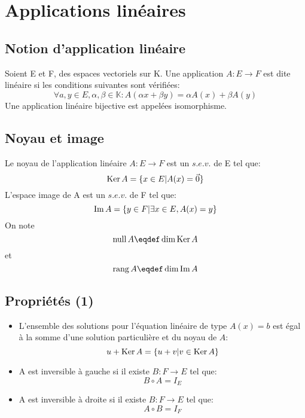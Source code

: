 \section{Applications linéaires}

\subsection{Notion d'application linéaire}
Soient E et F, des espaces vectoriels sur K.
Une application $A : E \rightarrow F$ est dite linéaire si les conditions suivantes sont vérifiées:\\
\[\forall a,y \in E, \alpha ,\beta \in\mathbb{K} : A(\alpha{x} + \beta{y}) = \alpha{A(x)} + \beta{A(y)}\]
Une application linéaire bijective est appelées isomorphisme.

\subsection{Noyau et image}
Le noyau de l'application linéaire $A: E \rightarrow F$ est un $s.e.v.$ de E tel que:\\
\[\operatorname{Ker} A = \{x \in E| A(x) = \vec{0}\}\]
L'espace image de A est un $s.e.v.$ de F tel que:\\
\[\operatorname{Im} A = \{y \in F | \exists x \in E, A(x) = y\}\]
On note
\[\newnull A \eqdef \dim \newker A\]
et
\[\rang A \eqdef \dim \newim A\]

\subsection{Propriétés (1)}
\begin{itemize}
\item L'ensemble des solutions pour l'équation linéaire de type $A(x) = b$ est égal à la somme d'une solution particulière et du noyau de $A$:
\[u + \operatorname{Ker} A = \{u + v | v \in \operatorname{Ker} A\}\]
\item A est inversible à gauche si il existe $B : F \rightarrow E$ tel que:\[B\circ A = I_E\]
\item A est inversible à droite si il existe $B : F \rightarrow E$ tel que:\[A\circ B = I_F\]
\end{itemize}

